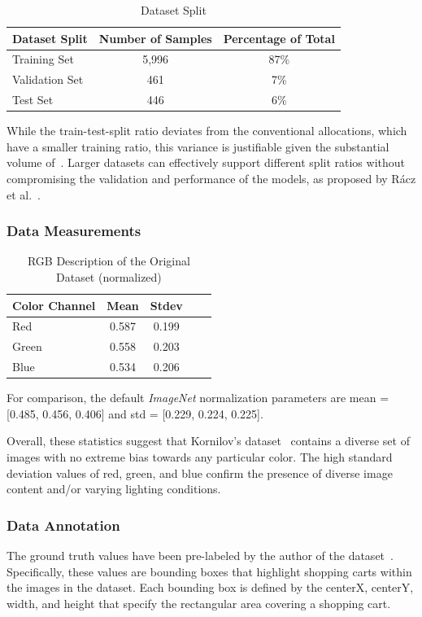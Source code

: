 \documentclass[10pt,twocolumn,letterpaper]{article}
\begin{document}
\begin{table}[h]
\centering
\begin{tabular}{lcc}
\hline
\textbf{Dataset Split} & \textbf{Number of Samples} & \textbf{Percentage of Total} \\
\hline
Training Set     & 5,996 & 87\% \\
Validation Set   & 461   & 7\%  \\
Test Set         & 446   & 6\%  \\
\hline
\end{tabular}
\caption{Dataset Split}
\label{tab:dataset_split}
\end{table}

While the train-test-split ratio deviates from the conventional allocations, which have a smaller training ratio, this variance is justifiable given the substantial volume of~\cite{kornilov-dataset}. Larger datasets can effectively support different split ratios without compromising the validation and performance of the models, as proposed by Rácz et al.~\cite{molecules}.

\subsubsection{Data Measurements}

\begin{table}[ht]
\centering
\begin{tabular}{lcccc}
\hline
\textbf{Color Channel} & \textbf{Mean} & \textbf{Stdev} \\ 
\hline
Red & 0.587 & 0.199 \\
Green & 0.558 & 0.203 \\
Blue & 0.534 & 0.206 \\
\hline
\end{tabular}
\caption{RGB Description of the Original Dataset (normalized)}
\end{table}
For comparison, the default \textit{ImageNet} normalization parameters are mean = [0.485, 0.456, 0.406] and std = [0.229, 0.224, 0.225].

Overall, these statistics suggest that Kornilov's dataset~\cite{kornilov-dataset} contains a diverse set of images with no extreme bias towards any particular color. The high standard deviation values of red, green, and blue confirm the presence of diverse image content and/or varying lighting conditions. 

\subsubsection{Data Annotation}
The ground truth values have been pre-labeled by the author of the dataset~\cite{kornilov-dataset}. Specifically, these values are bounding boxes that highlight shopping carts within the images in the dataset. Each bounding box is defined by the centerX, centerY, width, and height that specify the rectangular area covering a shopping cart. 
\end{document}
